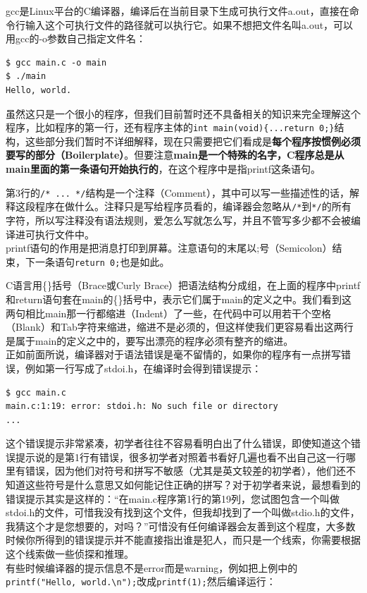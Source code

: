 \documentclass[12pt]{book}
\begin{document}
gcc是Linux平台的C编译器，编译后在当前目录下生成可执行文件a.out，直接在命令行输入这个可执行文件的路径就可以执行它。如果不想把文件名叫a.out，可以用gcc的-o参数自己指定文件名：

\begin{verbatim}
$ gcc main.c -o main
$ ./main
Hello, world.
\end{verbatim}

虽然这只是一个很小的程序，但我们目前暂时还不具备相关的知识来完全理解这个程序，比如程序的第一行，还有程序主体的\texttt{int\ main(void)\{...return\ 0;\}}结构，这些部分我们暂时不详细解释，现在只需要把它们看成是\textbf{每个程序按惯例必须要写的部分（Boilerplate）}。但要注意\textbf{main是一个特殊的名字，C程序总是从main里面的第一条语句开始执行的}，在这个程序中是指printf这条语句。

第3行的\texttt{/*\ ...\ */}结构是一个注释（Comment），其中可以写一些描述性的话，解释这段程序在做什么。注释只是写给程序员看的，编译器会忽略从\texttt{/*}到\texttt{*/}的所有字符，所以写注释没有语法规则，爱怎么写就怎么写，并且不管写多少都不会被编译进可执行文件中。\\
printf语句的作用是把消息打印到屏幕。注意语句的末尾以;号（Semicolon）结束，下一条语句\texttt{return\ 0;}也是如此。

C语言用\{\}括号（Brace或Curly
Brace）把语法结构分成组，在上面的程序中printf和return语句套在main的\{\}括号中，表示它们属于main的定义之中。我们看到这两句相比main那一行都缩进（Indent）了一些，在代码中可以用若干个空格（Blank）和Tab字符来缩进，缩进不是必须的，但这样使我们更容易看出这两行是属于main的定义之中的，要写出漂亮的程序必须有整齐的缩进。\\
正如前面所说，编译器对于语法错误是毫不留情的，如果你的程序有一点拼写错误，例如第一行写成了stdoi.h，在编译时会得到错误提示：

\begin{verbatim}
$ gcc main.c
main.c:1:19: error: stdoi.h: No such file or directory
...
\end{verbatim}

这个错误提示非常紧凑，初学者往往不容易看明白出了什么错误，即使知道这个错误提示说的是第1行有错误，很多初学者对照着书看好几遍也看不出自己这一行哪里有错误，因为他们对符号和拼写不敏感（尤其是英文较差的初学者），他们还不知道这些符号是什么意思又如何能记住正确的拼写？对于初学者来说，最想看到的错误提示其实是这样的：``在main.c程序第1行的第19列，您试图包含一个叫做stdoi.h的文件，可惜我没有找到这个文件，但我却找到了一个叫做stdio.h的文件，我猜这个才是您想要的，对吗？''可惜没有任何编译器会友善到这个程度，大多数时候你所得到的错误提示并不能直接指出谁是犯人，而只是一个线索，你需要根据这个线索做一些侦探和推理。\\
有些时候编译器的提示信息不是error而是warning，例如把上例中的\texttt{printf("Hello,\ world.\textbackslash{}n");}改成\texttt{printf(1);}然后编译运行：
\end{document}
